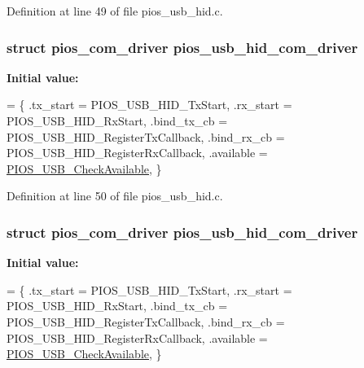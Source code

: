 Definition at line 49 of file pios\-\_\-usb\-\_\-hid.\-c.

\hypertarget{group___p_i_o_s___u_s_b___h_i_d_ga7bc5f832e095cad60f463436e377bb5d}{
\subsubsection[{pios\-\_\-usb\-\_\-hid\-\_\-com\-\_\-driver}]{\setlength{\rightskip}{0pt plus 5cm}struct {\bf pios\-\_\-com\-\_\-driver} pios\-\_\-usb\-\_\-hid\-\_\-com\-\_\-driver}}\label{group___p_i_o_s___u_s_b___h_i_d_ga7bc5f832e095cad60f463436e377bb5d}
{\bfseries Initial value\-:}
\begin{DoxyCode}
= \{
        .tx\_start    = PIOS\_USB\_HID\_TxStart,
        .rx\_start    = PIOS\_USB\_HID\_RxStart,
        .bind\_tx\_cb  = PIOS\_USB\_HID\_RegisterTxCallback,
        .bind\_rx\_cb  = PIOS\_USB\_HID\_RegisterRxCallback,
        .available   = \hyperlink{group___p_i_o_s___u_s_b_gab421c578c5d8da4eff14b6ce21c0cb5f}{PIOS\_USB\_CheckAvailable},
\}
\end{DoxyCode}


Definition at line 50 of file pios\-\_\-usb\-\_\-hid.\-c.

\hypertarget{group___p_i_o_s___u_s_b___h_i_d_ga7bc5f832e095cad60f463436e377bb5d}{
\subsubsection[{pios\-\_\-usb\-\_\-hid\-\_\-com\-\_\-driver}]{\setlength{\rightskip}{0pt plus 5cm}struct {\bf pios\-\_\-com\-\_\-driver} pios\-\_\-usb\-\_\-hid\-\_\-com\-\_\-driver}}\label{group___p_i_o_s___u_s_b___h_i_d_ga7bc5f832e095cad60f463436e377bb5d}
{\bfseries Initial value\-:}
\begin{DoxyCode}
= \{
        .tx\_start    = PIOS\_USB\_HID\_TxStart,
        .rx\_start    = PIOS\_USB\_HID\_RxStart,
        .bind\_tx\_cb  = PIOS\_USB\_HID\_RegisterTxCallback,
        .bind\_rx\_cb  = PIOS\_USB\_HID\_RegisterRxCallback,
        .available   = \hyperlink{group___p_i_o_s___u_s_b_gab421c578c5d8da4eff14b6ce21c0cb5f}{PIOS\_USB\_CheckAvailable},  
\}
\end{DoxyCode}


